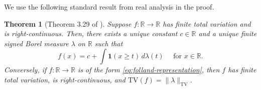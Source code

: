 \documentclass[10pt]{article}
\newtheorem{theorem}{Theorem}
\newcommand{\R}{{\mathbb R}}
\newcommand{\tv}{{\text{TV}}}
\newcommand{\ind}{{\mathbf{1}}}
\begin{document}
We use the following standard result from real analysis in the proof.
\begin{theorem}[Theorem 3.29 of \citet{folland1999real}]
\label{thm:folland-representation}
    Suppose $f: \R \to \R$ has finite total variation and is 
    right-continuous. Then, there exists a unique constant $c \in \R$ 
    and a unique finite signed Borel measure $\lambda$ on $\R$ such that
    \begin{equation}\label{eq:folland-representation}
        f(x) = c + \int \ind(x \ge t) \, d\lambda(t) 
        \quad \text{ for } x \in \R.
    \end{equation}
    Conversely, if $f: \R \to \R$ is of the form 
    \eqref{eq:folland-representation}, then $f$ has finite total 
    variation, is right-continuous, and 
    $\tv(f) = \|\lambda\|_{\text{TV}}$.
\end{theorem}
\end{document}
